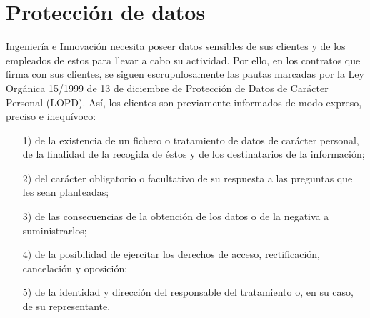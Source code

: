 \newpage
\section{Protección de datos}

Ingeniería e Innovación necesita poseer datos sensibles de sus clientes y
de los empleados de estos para llevar a cabo su actividad. Por ello, en los
contratos que firma con sus clientes, se siguen escrupulosamente las pautas
marcadas por la Ley Orgánica 15/1999 de 13 de diciembre de Protección de Datos
de Carácter Personal (LOPD). Así, los clientes son previamente
informados de modo expreso, preciso e inequívoco:

\begin{itemize}
\item[1)] de la existencia de un fichero o tratamiento de datos de carácter
personal, de la finalidad de la recogida de éstos y de los destinatarios de la
información;

\item[2)] del carácter obligatorio o facultativo de su respuesta a las preguntas
que les sean planteadas;

\item[3)] de las consecuencias de la obtención de los datos o de la negativa a
suministrarlos;

\item[4)] de la posibilidad de ejercitar los derechos de acceso, rectificación,
cancelación y oposición;

\item[5)] de la identidad y dirección del responsable del tratamiento o, en su
caso, de su representante.
\end{itemize}



